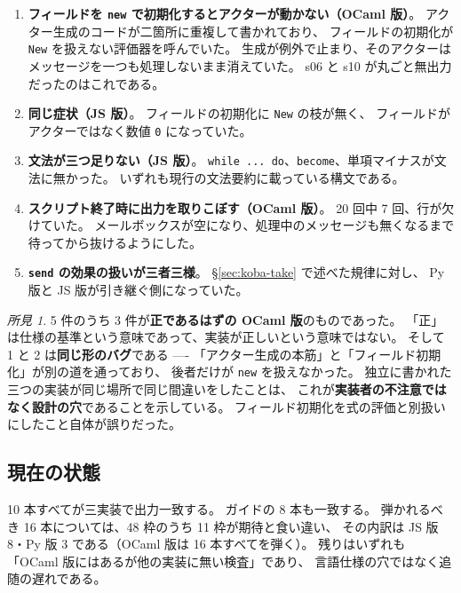 \documentclass[11pt,a4paper]{ltjsarticle}
\theoremstyle{definition}
\theoremstyle{remark}
\newtheorem{finding}[theorem]{所見}
\begin{document}
\begin{enumerate}
\item \textbf{フィールドを \texttt{new} で初期化するとアクターが動かない（OCaml 版）}。
      アクター生成のコードが二箇所に重複して書かれており、
      フィールドの初期化が \texttt{New} を扱えない評価器を呼んでいた。
      生成が例外で止まり、そのアクターはメッセージを一つも処理しないまま消えていた。
      s06 と s10 が丸ごと無出力だったのはこれである。
\item \textbf{同じ症状（JS 版）}。
      フィールドの初期化に \texttt{New} の枝が無く、
      フィールドがアクターではなく数値 \texttt{0} になっていた。
\item \textbf{文法が三つ足りない（JS 版）}。
      \texttt{while ... do}、\texttt{become}、単項マイナスが文法に無かった。
      いずれも現行の文法要約に載っている構文である。
\item \textbf{スクリプト終了時に出力を取りこぼす（OCaml 版）}。
      20 回中 7 回、行が欠けていた。
      メールボックスが空になり、処理中のメッセージも無くなるまで待ってから抜けるようにした。
\item \textbf{\texttt{send} の効果の扱いが三者三様}。
      \S\ref{sec:koba-take} で述べた規律に対し、
      Py 版と JS 版が引き継ぐ側になっていた。
\end{enumerate}

\begin{finding}
5 件のうち 3 件が\textbf{正であるはずの OCaml 版}のものであった。
「正」は仕様の基準という意味であって、実装が正しいという意味ではない。
そして 1 と 2 は\textbf{同じ形のバグ}である ----
「アクター生成の本筋」と「フィールド初期化」が別の道を通っており、
後者だけが \texttt{new} を扱えなかった。
独立に書かれた三つの実装が同じ場所で同じ間違いをしたことは、
これが\textbf{実装者の不注意ではなく設計の穴}であることを示している。
フィールド初期化を式の評価と別扱いにしたこと自体が誤りだった。
\end{finding}

\subsection{現在の状態}

10 本すべてが三実装で出力一致する。
ガイドの 8 本も一致する。
弾かれるべき 16 本については、48 枠のうち 11 枠が期待と食い違い、
その内訳は JS 版 8・Py 版 3 である（OCaml 版は 16 本すべてを弾く）。
残りはいずれも「OCaml 版にはあるが他の実装に無い検査」であり、
言語仕様の穴ではなく追随の遅れである。

\end{document}
